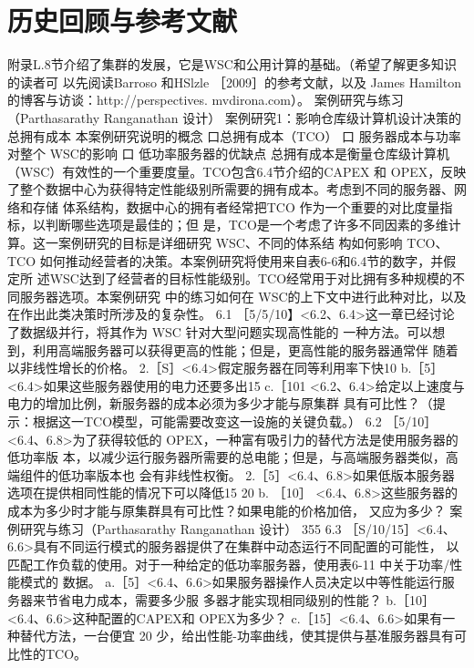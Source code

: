 \section{历史回顾与参考文献}
附录L.8节介绍了集群的发展，它是WSC和公用计算的基础。（希望了解更多知识的读者可
以先阅读Barroso 和HSlzle ［2009］的参考文献，以及 James Hamilton 的博客与访谈：http://perspectives.
mvdirona.com）。
案例研究与练习（Parthasarathy Ranganathan 设计）
案例研究1：影响仓库级计算机设计决策的总拥有成本
本案例研究说明的概念
口总拥有成本（TCO）
口 服务器成本与功率对整个 WSC的影响
口 低功率服务器的优缺点
总拥有成本是衡量仓库级计算机（WSC）有效性的一个重要度量。TCO包含6.4节介绍的CAPEX 和
OPEX，反映了整个数据中心为获得特定性能级别所需要的拥有成本。考虑到不同的服务器、网络和存储
体系结构，数据中心的拥有者经常把TCO 作为一个重要的对比度量指标，以判断哪些选项是最佳的；但
是，TCO是一个考虑了许多不同因素的多维计算。这一案例研究的目标是详细研究 WSC、不同的体系结
构如何影响 TCO、TCO 如何推动经营者的决策。本案例研究将使用来自表6-6和6.4节的数字，并假定所
述WSC达到了经营者的目标性能级别。TCO经常用于对比拥有多种规模的不同服务器选项。本案例研究
中的练习如何在 WSC的上下文中进行此种对比，以及在作出此类决策时所涉及的复杂性。
6.1 ［5/5/10】<6.2、6.4>这一章已经讨论了数据级并行，将其作为 WSC 针对大型问题实现高性能的
一种方法。可以想到，利用高端服务器可以获得更高的性能；但是，更高性能的服务器通常伴
随着以非线性增长的价格。
2.［S］<6.4>假定服务器在同等利用率下快10%
b.［5］<6.4>如果这些服务器使用的电力还要多出15%
c.［101 <6.2、6.4>给定以上速度与电力的增加比例，新服务器的成本必须为多少才能与原集群
具有可比性？（提示：根据这一TCO模型，可能需要改变这一设施的关键负载。）
6.2
［5/10］ <6.4、6.8>为了获得较低的 OPEX，一种富有吸引力的替代方法是使用服务器的低功率版
本，以减少运行服务器所需要的总电能；但是，与高端服务器类似，高端组件的低功率版本也
会有非线性权衡。
2.［5］<6.4、6.8>如果低版本服务器选项在提供相同性能的情况下可以降低15%
20%
b. ［10］ <6.4、6.8>这些服务器的成本为多少时才能与原集群具有可比性？如果电能的价格加倍，
又应为多少？
案例研究与练习（Parthasarathy Ranganathan 设计）
355
6.3 ［S/10/15］<6.4、6.6>具有不同运行模式的服务器提供了在集群中动态运行不同配置的可能性，
以匹配工作负载的使用。对于一种给定的低功率服务器，使用表6-11 中关于功率/性能模式的
数据。
a.［5］<6.4、6.6>如果服务器操作人员决定以中等性能运行服务器来节省电力成本，需要多少服
多器才能实现相同级别的性能？
b.［10］<6.4、6.6>这种配置的CAPEX和 OPEX为多少？
c.［15］<6.4、6.6>如果有一种替代方法，一台便宜 20%
少，给出性能-功率曲线，使其提供与基准服务器具有可比性的TCO。
